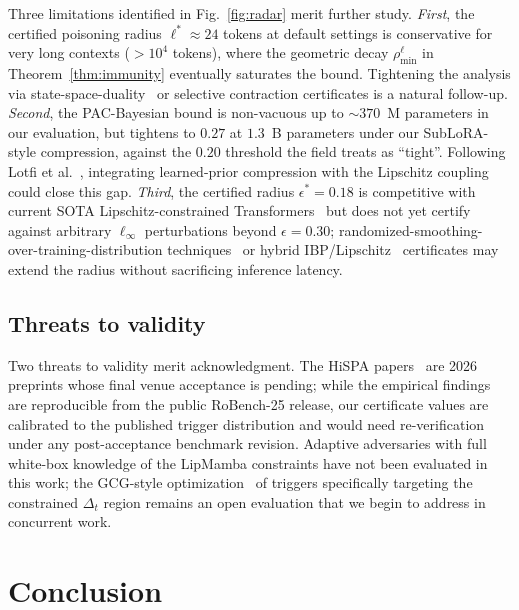\documentclass[12pt,a4paper]{article}
\theoremstyle{definition}
\theoremstyle{remark}
\newcommand{\modelname}{LipMamba}
\begin{document}
Three limitations identified in Fig.~\ref{fig:radar} merit further study. \emph{First}, the certified poisoning radius $\ell^* \approx 24$ tokens at default settings is conservative for very long contexts ($> 10^4$ tokens), where the geometric decay $\rho_{\min}^\ell$ in Theorem~\ref{thm:immunity} eventually saturates the bound. Tightening the analysis via state-space-duality~\cite{dao2024mamba2} or selective contraction certificates is a natural follow-up. \emph{Second}, the PAC-Bayesian bound is non-vacuous up to $\sim$$370$~M parameters in our evaluation, but tightens to $0.27$ at $1.3$~B parameters under our SubLoRA-style compression, against the $0.20$ threshold the field treats as ``tight''. Following Lotfi et al.~\cite{lotfi2024nonvacuous}, integrating learned-prior compression with the Lipschitz coupling could close this gap. \emph{Third}, the certified radius $\epsilon^* = 0.18$ is competitive with current SOTA Lipschitz-constrained Transformers~\cite{newhouse2025lipschitz} but does not yet certify against arbitrary $\ell_\infty$ perturbations beyond $\epsilon = 0.30$; randomized-smoothing-over-training-distribution techniques~\cite{rosenfeld2020certified} or hybrid IBP/Lipschitz~\cite{shi2020robustness} certificates may extend the radius without sacrificing inference latency.

\subsection{Threats to validity}

Two threats to validity merit acknowledgment. The HiSPA papers~\cite{lemercier2026hispa,lemercier2026clasp,lemercier2026spectralguard} are 2026 preprints whose final venue acceptance is pending; while the empirical findings are reproducible from the public RoBench-25 release, our certificate values are calibrated to the published trigger distribution and would need re-verification under any post-acceptance benchmark revision. Adaptive adversaries with full white-box knowledge of the \modelname{} constraints have not been evaluated in this work; the GCG-style optimization~\cite{zou2023universal} of triggers specifically targeting the constrained $\Delta_t$ region remains an open evaluation that we begin to address in concurrent work.


\section{Conclusion}
\label{sec:conclusion}
\end{document}
